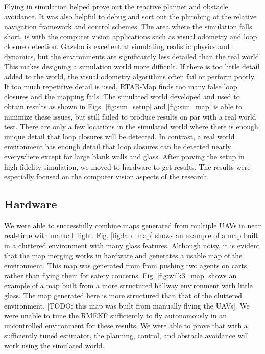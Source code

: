 \documentclass[letterpaper, 10 pt, conference]{ieeeconf}  %
\newcommand{\todo}[1]{{\color{blue}[TODO: #1]}}
\begin{document}
Flying in simulation helped prove out the reactive planner and obstacle avoidance. It was also helpful to debug and sort out the plumbing of the relative navigation framework and control schemes. The area where the simulation falls short, is with the computer vision applications such as visual odometry and loop closure detection. Gazebo is excellent at simulating realistic physics and dynamics, but the environments are significantly less detailed than the real world. This makes designing a simulation world more difficult. If there is too little detail added to the world, the visual odometry algorithms often fail or perform poorly. If too much repetitive detail is used, RTAB-Map finds too many false loop closures and the mapping fails. The simulated world developed and used to obtain results as shown in Figs. \ref{fig:sim_setup} and \ref{fig:sim_map} is able to minimize these issues, but still failed to produce results on par with a real world test. There are only a few locations in the simulated world where there is enough unique detail that loop closures will be detected. In contrast, a real world environment has enough detail that loop closures can be detected nearly everywhere except for large blank walls and glass. After proving the setup in high-fidelity simulation, we moved to hardware to get results. The results were especially focused on the computer vision aspects of the research.

\subsection{Hardware}

We were able to successfully combine maps generated from multiple UAVs in near real-time with manual flight. Fig. \ref{fig:lab_map} shows an example of a map built in a cluttered environment with many glass features. Although noisy, it is evident that the map merging works in hardware and generates a usable map of the environment. This map was generated from from pushing two agents on carts rather than flying them for safety concerns. Fig. \ref{fig:wilk3_map} shows an example of a map built from a more structured hallway environment with little glass. The map generated here is more structured than that of the cluttered environment. \todo{this map was built from manually flying the UAVs}. We were unable to tune the RMEKF sufficiently to fly autonomously in an uncontrolled environment for these results. We were able to prove that with a sufficiently tuned estimator, the planning, control, and obstacle avoidance will work using the simulated world.
\end{document}
